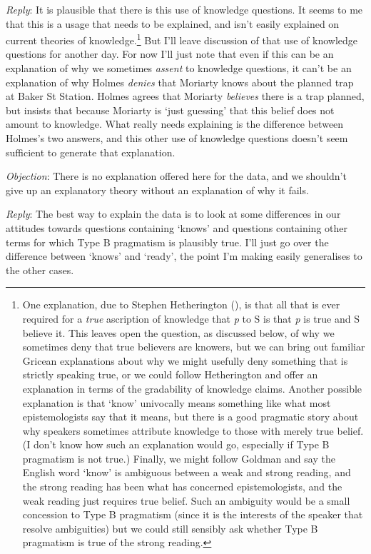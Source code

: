 \documentclass[
  10pt,
  letterpaper,
  DIV=11,
  numbers=noendperiod,
  twoside]{scrartcl}
\begin{document}
\emph{Reply}: It is plausible that there is this use of knowledge
questions. It seems to me that this is a usage that needs to be
explained, and isn't easily explained on current theories of
knowledge.\footnote{One explanation, due to Stephen Hetherington
  (), is that all that is ever
  required for a \emph{true} ascription of knowledge that \emph{p} to S
  is that \emph{p} is true and S believe it. This leaves open the
  question, as discussed below, of why we sometimes deny that true
  believers are knowers, but we can bring out familiar Gricean
  explanations about why we might usefully deny something that is
  strictly speaking true, or we could follow Hetherington and offer an
  explanation in terms of the gradability of knowledge claims. Another
  possible explanation is that `know' univocally means something like
  what most epistemologists say that it means, but there is a good
  pragmatic story about why speakers sometimes attribute knowledge to
  those with merely true belief. (I don't know how such an explanation
  would go, especially if Type B pragmatism is not true.) Finally, we
  might follow Goldman and say the English word `know' is ambiguous
  between a weak and strong reading, and the strong reading has been
  what has concerned epistemologists, and the weak reading just requires
  true belief. Such an ambiguity would be a small concession to Type B
  pragmatism (since it is the interests of the speaker that resolve
  ambiguities) but we could still sensibly ask whether Type B pragmatism
  is true of the strong reading.} But I'll leave discussion of that use
of knowledge questions for another day. For now I'll just note that even
if this can be an explanation of why we sometimes \emph{assent} to
knowledge questions, it can't be an explanation of why Holmes
\emph{denies} that Moriarty knows about the planned trap at Baker St
Station. Holmes agrees that Moriarty \emph{believes} there is a trap
planned, but insists that because Moriarty is `just guessing' that this
belief does not amount to knowledge. What really needs explaining is the
difference between Holmes's two answers, and this other use of knowledge
questions doesn't seem sufficient to generate that explanation.

\emph{Objection}: There is no explanation offered here for the data, and
we shouldn't give up an explanatory theory without an explanation of why
it fails.

\emph{Reply}: The best way to explain the data is to look at some
differences in our attitudes towards questions containing `knows' and
questions containing other terms for which Type B pragmatism is
plausibly true. I'll just go over the difference between `knows' and
`ready', the point I'm making easily generalises to the other cases.
\end{document}
